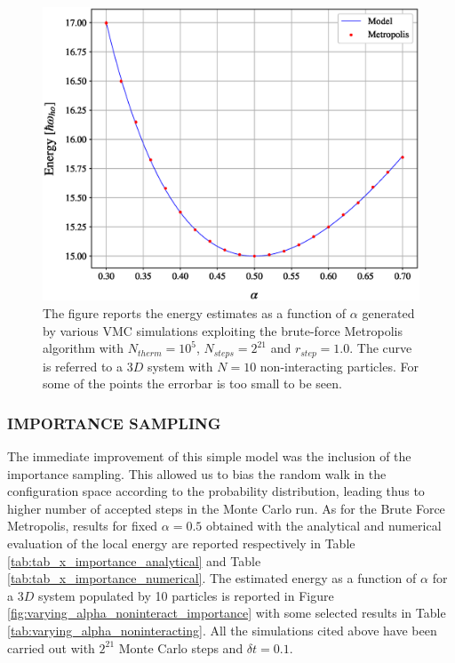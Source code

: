 \begin{figure}[H]
    \centering
    \includegraphics[scale=0.37]{images/varying_alpha_noninteract_metropolis.eps}
    \caption{The figure reports the energy estimates as a function of $\alpha$ generated by various VMC simulations exploiting the brute-force Metropolis algorithm with $N_{therm}=10^5$, $N_{steps}=2^{21}$ and $r_{step}=1.0$. The curve is referred to a $3D$ system with $N=10$ non-interacting particles. For some of the points the errorbar is too small to be seen. }
    \label{fig:varying_alpha_noninteract_metropolis}
\end{figure}


\subsubsection{IMPORTANCE SAMPLING}
The immediate improvement of this simple model was the inclusion of the importance sampling. This allowed us to bias the random walk in the configuration space according to the probability distribution, leading thus to higher number of accepted steps in the Monte Carlo run. As for the Brute Force Metropolis, results for fixed $\alpha=0.5$ obtained with the analytical and numerical evaluation of the local energy are reported respectively in Table \ref{tab:tab_x_importance_analytical} and Table \ref{tab:tab_x_importance_numerical}. The estimated energy as a function of $\alpha$ for a $3D$ system populated by 10 particles is reported in Figure \ref{fig:varying_alpha_noninteract_importance} with some selected results in Table \ref{tab:varying_alpha_noninteracting}. All the simulations cited above have been carried out with $2^{21}$ Monte Carlo steps and $\delta t = 0.1$. 



